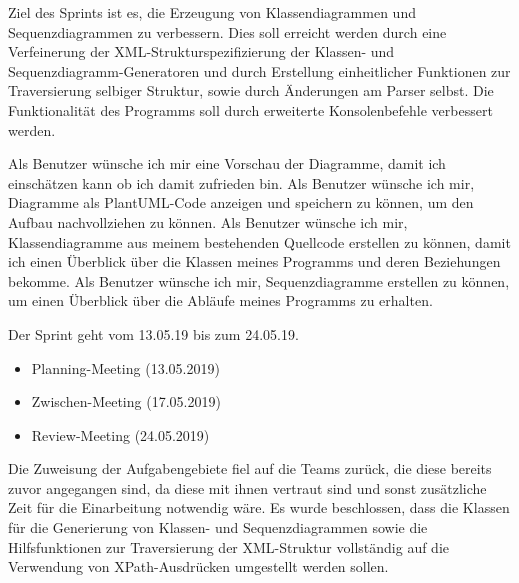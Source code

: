 Ziel des Sprints ist es, die Erzeugung von Klassendiagrammen und Sequenzdiagrammen zu verbessern. Dies soll erreicht werden durch eine Verfeinerung der XML-Strukturspezifizierung der Klassen- und Sequenzdiagramm-Generatoren und durch Erstellung einheitlicher Funktionen zur Traversierung selbiger Struktur, sowie durch Änderungen am Parser selbst. Die Funktionalität des Programms soll durch erweiterte Konsolenbefehle verbessert werden.
\nsecend

Als Benutzer wünsche ich mir eine Vorschau der Diagramme, damit ich einschätzen kann ob ich
damit zufrieden bin.
\nsecend
{}
Als Benutzer wünsche ich mir, Diagramme als PlantUML-Code anzeigen und speichern zu können, um den Aufbau nachvollziehen zu können.
\nsecend
{}
Als Benutzer wünsche ich mir, Klassendiagramme aus meinem bestehenden Quellcode erstellen zu können, damit ich einen Überblick über die Klassen meines Programms und deren Beziehungen bekomme.
\nsecend
{}
Als Benutzer wünsche ich mir, Sequenzdiagramme erstellen zu können, um einen Überblick über die Abläufe meines Programms zu erhalten.
\nsecend
\nsecend %

Der Sprint geht vom 13.05.19 bis zum 24.05.19.
\nsecend%

\begin{itemize}
\item Planning-Meeting (13.05.2019)
\item Zwischen-Meeting (17.05.2019)
\item Review-Meeting (24.05.2019)
\end{itemize}{}
\nsecend%

Die Zuweisung der Aufgabengebiete fiel auf die Teams zurück, die diese bereits zuvor angegangen sind, da diese mit ihnen vertraut sind und sonst zusätzliche Zeit für die Einarbeitung notwendig wäre.
Es wurde beschlossen, dass die Klassen für die Generierung von Klassen- und Sequenzdiagrammen sowie die Hilfsfunktionen zur Traversierung der XML-Struktur vollständig auf die Verwendung von XPath-Ausdrücken umgestellt werden sollen. 
\nsecend


